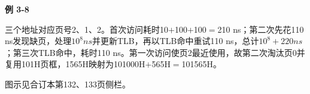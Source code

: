{\color{ink}\bfseries 例 3-8}\par\vspace{1bp}三个地址对应页号2、1、2。首次访问耗时10\(+\allowbreak{}\)100\(+\allowbreak{}\)100\(=\allowbreak{}\)210 ns；第二次先花110 ns发现缺页，处理\(10^{8} ns\)并更新TLB，再以TLB命中重试110 ns，总计\(10^{8}+\allowbreak{}220 ns\)；第三次TLB命中，耗时110 ns。第一次访问使页2最近使用，故第二次淘汰页0并复用101H页框，1565H映射为101000H\(+\allowbreak{}\)565H\(=\allowbreak{}\)101565H。\par {\color{ink}图示见合订本第132、133页侧栏。}
